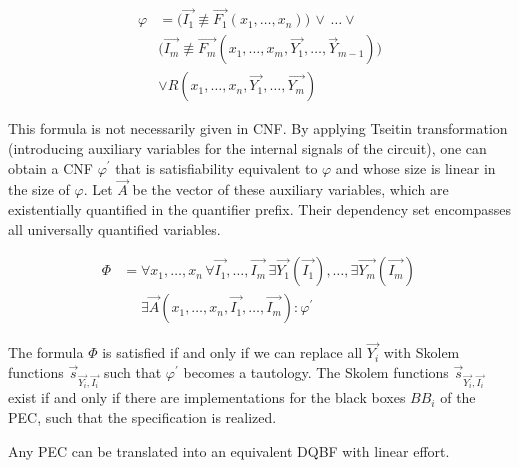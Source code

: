 \documentclass[runningheads]{llncs}
\begin{document}
\begin{equation}
\begin{split}\nonumber
	 \varphi &=  \big( \overrightarrow{I_1} \not\equiv \overrightarrow{F_1} (x_1 ,\dots, x_n)  \big) \, \lor \, \dots \lor  \\
	 & \big( \overrightarrow{I_m} \not\equiv \overrightarrow{F_m} (x_1 ,\dots,x_m, \overrightarrow{Y_1} ,\dots,\overrightarrow{Y}_{m-1})  \big) \\
	 & \lor R(x_1,\dots, x_n, \overrightarrow{Y_1},\dots,\overrightarrow{Y_m})
\end{split}
\end{equation}

This formula is not necessarily given in CNF. By applying Tseitin transformation (introducing auxiliary variables for the internal signals of the circuit), one can obtain a
CNF $\varphi^{\prime}$ that is satisfiability equivalent to $\varphi$ and whose size is linear in the size of $\varphi$.
Let $\overrightarrow{A}$ be the vector of these auxiliary variables, which are existentially quantified in the quantifier prefix.
Their dependency set encompasses all universally quantified variables.

\begin{equation}
\begin{split}\nonumber
\Phi &= 	\forall x_1,\dots,x_n \, \forall \overrightarrow{I_1},\dots,\overrightarrow{I_m} \, \exists \overrightarrow{Y_1}(\overrightarrow{I_1}),\dots, \exists \overrightarrow{Y_m}(\overrightarrow{I_m}) \, \\
& \,\,\,\,\,\,\,\, \exists \overrightarrow{A}(x_1,\dots,x_n, \overrightarrow{I_1},\dots,\overrightarrow{I_m}): \varphi^{\prime}
\end{split}
\end{equation}

The formula $\Phi$ is satisfied if and only if we can replace
all $\overrightarrow{Y_i}$ with Skolem functions $\overrightarrow{s}_{\overrightarrow{Y_i},\overrightarrow{I_i}}$ such that $\varphi^{\prime}$ becomes a tautology.
The Skolem functions $\overrightarrow{s}_{\overrightarrow{Y_i},\overrightarrow{I_i}}$ exist if and only if there are implementations for the black boxes $BB_i$ of the PEC, such that the specification is realized.

\begin{lemma}
  Any PEC can be translated into an equivalent DQBF with linear effort.
\end{lemma}
\end{document}
